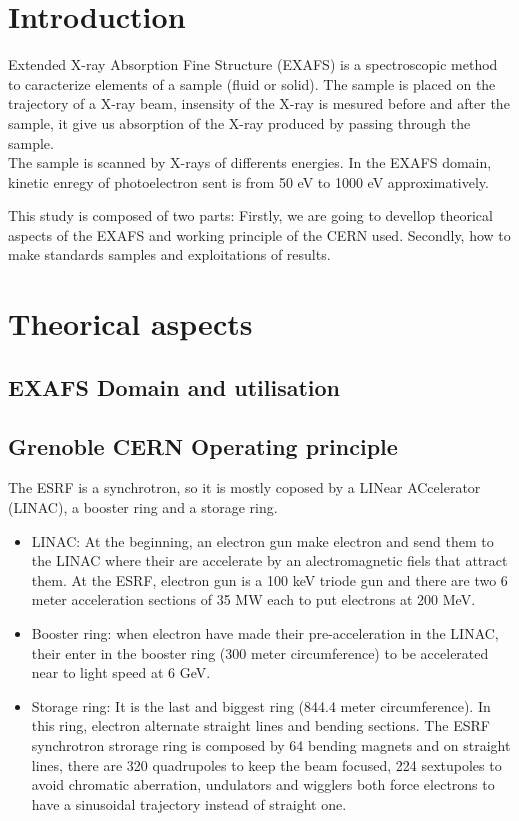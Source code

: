 \documentclass[11pt,a4paper,oneside]{article}
\begin{document}


\section*{Introduction}

Extended X-ray Absorption Fine Structure (EXAFS) is a spectroscopic method to caracterize elements of a sample (fluid or solid). The sample is placed on the trajectory of a X-ray beam, insensity of the X-ray is mesured before and after the sample, it give us absorption of the X-ray produced by passing through the sample.\\
The sample is scanned by X-rays of differents energies. In the EXAFS domain, kinetic enregy of photoelectron sent is from 50 eV to 1000 eV approximatively.

This study is composed of two parts: Firstly, we are going to devellop theorical aspects of the EXAFS and working principle of the CERN used. Secondly, how to make standards samples and exploitations of results.




\newpage


\section{Theorical aspects}
\subsection{EXAFS Domain and utilisation}


\subsection{Grenoble CERN Operating principle}

The ESRF is a synchrotron, so it is mostly coposed by a LINear ACcelerator (LINAC), a booster ring and a storage ring.
\begin{itemize}
    \item LINAC: At the beginning, an electron gun make electron and send them to the LINAC where their are accelerate by an alectromagnetic fiels that attract them. At the ESRF, electron gun is a 100 keV triode gun and there are two 6 meter acceleration sections of 35 MW each to put electrons at 200 MeV.
    \item Booster ring: when electron have made their pre-acceleration in the LINAC, their enter in the booster ring (300 meter circumference) to be accelerated near to light speed at 6 GeV.
    \item Storage ring: It is the last and biggest ring (844.4 meter circumference). In this ring, electron alternate straight lines and bending sections. The ESRF synchrotron strorage ring is composed by 64 bending magnets and on straight lines, there are 320 quadrupoles to keep the beam focused, 224 sextupoles to avoid chromatic aberration, undulators and wigglers both force electrons to have a sinusoidal trajectory instead of straight one.
\end{itemize}
\medskip
\end{document}
